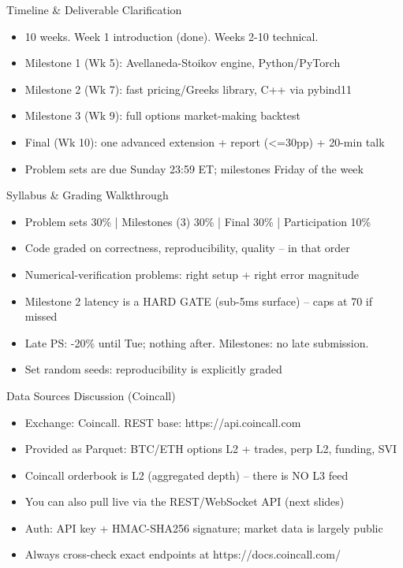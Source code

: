 \documentclass[aspectratio=169,10pt]{beamer}
\begin{document}
\begin{frame}{Timeline \& Deliverable Clarification}
\begin{itemize}
  \item 10 weeks. Week 1 introduction (done). Weeks 2-10 technical.
  \item Milestone 1 (Wk 5): Avellaneda-Stoikov engine, Python/PyTorch
  \item Milestone 2 (Wk 7): fast pricing/Greeks library, C++ via pybind11
  \item Milestone 3 (Wk 9): full options market-making backtest
  \item Final (Wk 10): one advanced extension + report (\textless{}=30pp) + 20-min talk
  \item Problem sets are due Sunday 23:59 ET; milestones Friday of the week
\end{itemize}
\end{frame}

\begin{frame}{Syllabus \& Grading Walkthrough}
\begin{itemize}
  \item Problem sets 30\%  |  Milestones (3) 30\%  |  Final 30\%  |  Participation 10\%
  \item Code graded on correctness, reproducibility, quality -- in that order
  \item Numerical-verification problems: right setup + right error magnitude
  \item Milestone 2 latency is a HARD GATE (sub-5ms surface) -- caps at 70 if missed
  \item Late PS: -20\% until Tue; nothing after. Milestones: no late submission.
  \item Set random seeds: reproducibility is explicitly graded
\end{itemize}
\end{frame}

\begin{frame}{Data Sources Discussion (Coincall)}
\begin{itemize}
  \item Exchange: Coincall.  REST base: https://api.coincall.com
  \item Provided as Parquet: BTC/ETH options L2 + trades, perp L2, funding, SVI
  \item Coincall orderbook is L2 (aggregated depth) -- there is NO L3 feed
  \item You can also pull live via the REST/WebSocket API (next slides)
  \item Auth: API key + HMAC-SHA256 signature; market data is largely public
  \item Always cross-check exact endpoints at https://docs.coincall.com/
\end{itemize}
\end{frame}
\end{document}
